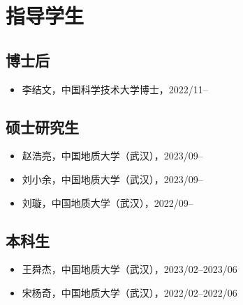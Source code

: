 \section{指导学生}

\subsection{博士后}
\begin{itemize}
\item 李结文，中国科学技术大学博士，2022/11--
\end{itemize}

\subsection{硕士研究生}
\begin{itemize}
\item 赵浩亮，中国地质大学（武汉），2023/09--
\item 刘小余，中国地质大学（武汉），2023/09--
\item 刘璇，中国地质大学（武汉），2022/09--
\end{itemize}

\subsection{本科生}
\begin{itemize}
\item 王舜杰，中国地质大学（武汉），2023/02--2023/06
\item 宋杨奇，中国地质大学（武汉），2022/02--2022/06
\end{itemize}
